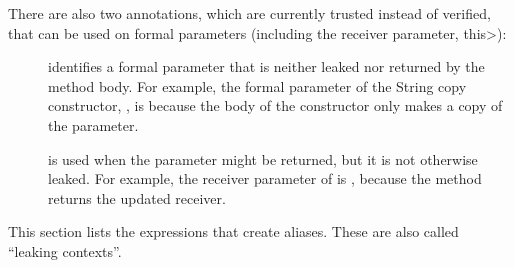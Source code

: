 There are also two annotations, which are currently trusted instead of verified,
that can be used on formal parameters (including
the receiver parameter, \<this>):

\begin{description}

\item[]
identifies a formal parameter that is neither leaked nor
returned by the method body.
For example, the formal parameter of the String copy constructor,
, is  because the body of the constructor
only makes a copy of the parameter.

\item[]
is used when the parameter might be returned, but it is not
otherwise leaked.
For example, the receiver parameter of  is
, because the method returns the updated receiver.

\end{description}

This section lists the expressions that create aliases.  These are also
called ``leaking contexts''.

